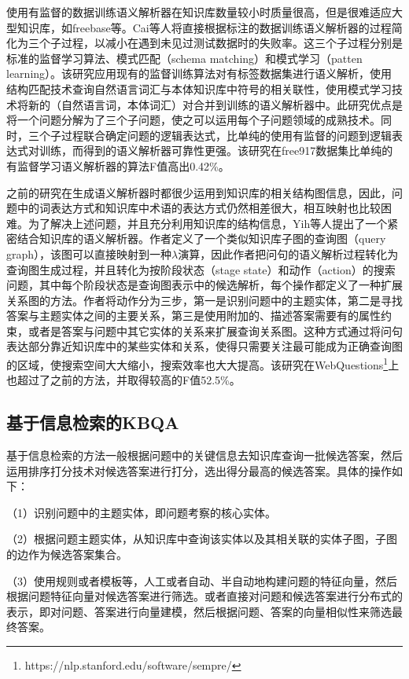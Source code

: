 使用有监督的数据训练语义解析器在知识库数量较小时质量很高，但是很难适应大型知识库，如freebase等。Cai\cite{Cai}等人将直接根据标注的数据训练语义解析器的过程简化为三个子过程，以减小在遇到未见过测试数据时的失败率。这三个子过程分别是标准的监督学习算法、模式匹配（schema matching）和模式学习（patten learning）。该研究应用现有的监督训练算法对有标签数据集进行语义解析，使用结构匹配技术查询自然语言词汇与本体知识库中符号的相关联性，使用模式学习技术将新的（自然语言词，本体词汇）对合并到训练的语义解析器中。此研究优点是将一个问题分解为了三个子问题，使之可以运用每个子问题领域的成熟技术。同时，三个子过程联合确定问题的逻辑表达式，比单纯的使用有监督的问题到逻辑表达式对训练，而得到的语义解析器可靠性更强。该研究在free917数据集比单纯的有监督学习语义解析器的算法F值高出0.42\%。

之前的研究在生成语义解析器时都很少运用到知识库的相关结构图信息，因此，问题中的词表达方式和知识库中术语的表达方式仍然相差很大，相互映射也比较困难。为了解决上述问题，并且充分利用知识库的结构信息，Yih\cite{Yih}等人提出了一个紧密结合知识库的语义解析器。作者定义了一个类似知识库子图的查询图（query graph），该图可以直接映射到一种$\lambda$演算，因此作者把问句的语义解析过程转化为查询图生成过程，并且转化为按阶段状态（stage state）和动作（action）的搜索问题，其中每个阶段状态是查询图表示中的候选解析，每个操作都定义了一种扩展关系图的方法。作者将动作分为三步，第一是识别问题中的主题实体，第二是寻找答案与主题实体之间的主要关系，第三是使用附加的、描述答案需要有的属性约束，或者是答案与问题中其它实体的关系来扩展查询关系图。这种方式通过将问句表达部分靠近知识库中的某些实体和关系，使得只需要关注最可能成为正确查询图的区域，使搜索空间大大缩小，搜索效率也大大提高。该研究在WebQuestions\footnote{https://nlp.stanford.edu/software/sempre/}上也超过了之前的方法，并取得较高的F值52.5\%。

\subsection{基于信息检索的KBQA}
基于信息检索的方法一般根据问题中的关键信息去知识库查询一批候选答案，然后运用排序打分技术对候选答案进行打分，选出得分最高的候选答案。具体的操作如下：

（1）识别问题中的主题实体，即问题考察的核心实体。

（2）根据问题主题实体，从知识库中查询该实体以及其相关联的实体子图，子图的边作为候选答案集合。

（3）使用规则或者模板等，人工或者自动、半自动地构建问题的特征向量，然后根据问题特征向量对候选答案进行筛选。或者直接对问题和候选答案进行分布式的表示，即对问题、答案进行向量建模，然后根据问题、答案的向量相似性来筛选最终答案。

